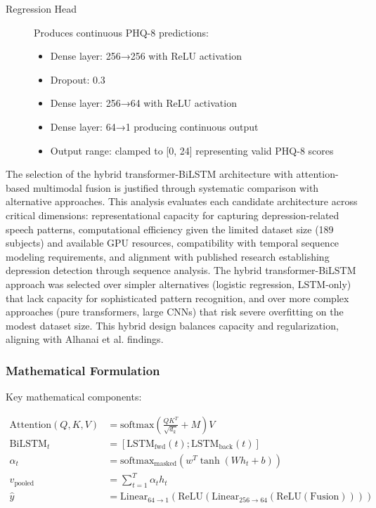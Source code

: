 \documentclass[12pt]{article}
\begin{document}
\begin{description}
		\item[Regression Head] Produces continuous PHQ-8 predictions:
		\begin{itemize}
			\item Dense layer: 256→256 with ReLU activation
			\item Dropout: 0.3
			\item Dense layer: 256→64 with ReLU activation
			\item Dense layer: 64→1 producing continuous output
			\item Output range: clamped to [0, 24] representing valid PHQ-8 scores
		\end{itemize}
	\end{description}

	The selection of the hybrid transformer-BiLSTM architecture with attention-based multimodal fusion is justified through systematic comparison with alternative approaches. This analysis evaluates each candidate architecture across critical dimensions: representational capacity for capturing depression-related speech patterns, computational efficiency given the limited dataset size (189 subjects) and available GPU resources, compatibility with temporal sequence modeling requirements, and alignment with published research establishing depression detection through sequence analysis. The hybrid transformer-BiLSTM approach was selected over simpler alternatives (logistic regression, LSTM-only) that lack capacity for sophisticated pattern recognition, and over more complex approaches (pure transformers, large CNNs) that risk severe overfitting on the modest dataset size. This hybrid design balances capacity and regularization, aligning with Alhanai et al. findings.

	\subsubsection{Mathematical Formulation}

	Key mathematical components:

	\begin{align}
	\text{Attention}(Q, K, V) &= \text{softmax}\left(\frac{QK^T}{\sqrt{d_k}} + M\right)V \\
	\text{BiLSTM}_t &= [\text{LSTM}_{\text{fwd}}(t); \text{LSTM}_{\text{back}}(t)] \\
	\alpha_t &= \text{softmax}_{\text{masked}}(w^T \tanh(Wh_t + b)) \\
	v_{\text{pooled}} &= \sum_{t=1}^{T} \alpha_t h_t \\
	\hat{y} &= \text{Linear}_{64 \to 1}(\text{ReLU}(\text{Linear}_{256 \to 64}(\text{ReLU}(\text{Fusion}))))
	\end{align}
\end{document}
